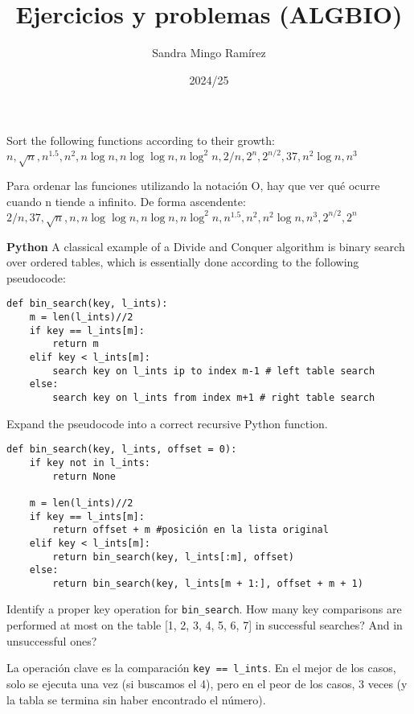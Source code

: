 \documentclass[nochap]{config/ejercicios}
\title{Ejercicios y problemas (ALGBIO)}
\author{Sandra Mingo Ramírez}
\date{2024/25}
\begin{document}
\maketitle

\begin{problemS}
Sort the following functions according to their growth: \\
$n, \sqrt{n}, n^{1.5}, n^2, n \log n, n \log \log n, n \log^2 n, 2/n, 2^n, 2^{n/2}, 37, n^2 \log n, n^3$

Para ordenar las funciones utilizando la notación O, hay que ver qué ocurre cuando n tiende a infinito. De forma ascendente: \\
$2/n, 37,\sqrt{n}, n, n \log \log n, n \log n, n \log^2 n, n^{1.5}, n^2, n^2 \log n, n^3, 2^{n/2}, 2^n$
\end{problemS}

\begin{problemS} \textbf{Python}
A classical example of a Divide and Conquer algorithm is binary search over ordered tables, which is essentially done according to the following pseudocode:
\begin{lstlisting}
def bin_search(key, l_ints):
	m = len(l_ints)//2
	if key == l_ints[m]:
		return m
	elif key < l_ints[m]:
		search key on l_ints ip to index m-1 # left table search
	else:
		search key on l_ints from index m+1 # right table search
\end{lstlisting}

Expand the pseudocode into a correct recursive Python function.
\begin{lstlisting}
def bin_search(key, l_ints, offset = 0):
	if key not in l_ints:
		return None

	m = len(l_ints)//2
	if key == l_ints[m]:
		return offset + m #posición en la lista original
	elif key < l_ints[m]:
		return bin_search(key, l_ints[:m], offset)
	else:
		return bin_search(key, l_ints[m + 1:], offset + m + 1)
\end{lstlisting}
\end{problemS}

\begin{problemS}
Identify a proper key operation for \texttt{bin\_search}. How many key comparisons are performed at most on the table [1, 2, 3, 4, 5, 6, 7] in successful searches? And in unsuccessful ones?

La operación clave es la comparación \texttt{key == l\_ints}. En el mejor de los casos, solo se ejecuta una vez (si buscamos el 4), pero en el peor de los casos, 3 veces (y la tabla se termina sin haber encontrado el número).
\end{problemS}
\end{document}
